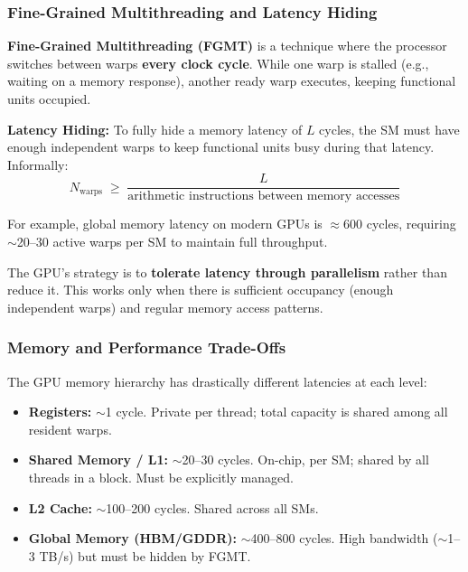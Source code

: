\subsubsection{Fine-Grained Multithreading and Latency Hiding}

\begin{definition}
	\textbf{Fine-Grained Multithreading (FGMT)} is a technique where the processor switches between warps \textbf{every clock cycle}. While one warp is stalled (e.g., waiting on a memory response), another ready warp executes, keeping functional units occupied.
\end{definition}


\begin{theorem}
	\textbf{Latency Hiding:} To fully hide a memory latency of $L$ cycles, the SM must have enough independent warps to keep functional units busy during that latency. Informally:
	$$N_{\text{warps}} \;\geq\; \frac{L}{\text{arithmetic instructions between memory accesses}}$$
\end{theorem}

\begin{example}
	For example, global memory latency on modern GPUs is $\approx 600$ cycles, requiring $\sim$20--30 active warps per SM to maintain full throughput.
\end{example}

\begin{important}
	The GPU's strategy is to \textbf{tolerate latency through parallelism} rather than reduce it. This works only when there is sufficient occupancy (enough independent warps) and regular memory access patterns.
\end{important}


\subsubsection{Memory and Performance Trade-Offs}

\begin{remark}
	The GPU memory hierarchy has drastically different latencies at each level:
	\begin{itemize}
		\item \textbf{Registers:} $\sim$1 cycle. Private per thread; total capacity is shared among all resident warps.
		\item \textbf{Shared Memory / L1:} $\sim$20--30 cycles. On-chip, per SM; shared by all threads in a block. Must be explicitly managed.
		\item \textbf{L2 Cache:} $\sim$100--200 cycles. Shared across all SMs.
		\item \textbf{Global Memory (HBM/GDDR):} $\sim$400--800 cycles. High bandwidth ($\sim$1--3 TB/s) but must be hidden by FGMT.
	\end{itemize}
\end{remark}

